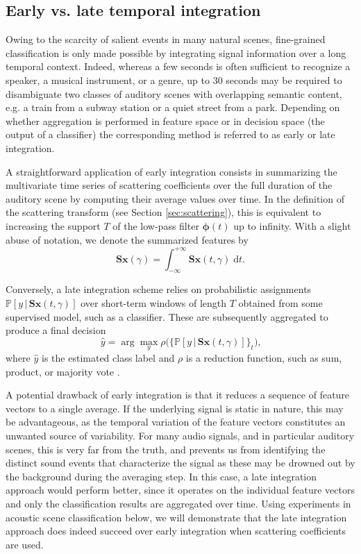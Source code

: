\documentclass[journal]{IEEEtran}
\makeatletter
\newcommand*{\eg}{e.g.\@\xspace}
\newcommand*{\vs}{vs.\@\xspace}
\makeatother
\begin{document}
\subsection{Early \vs late temporal integration}
\label{sec:eili}

Owing to the scarcity of salient events in many natural scenes,
fine-grained classification is only made
possible by integrating signal information over a long temporal context.
Indeed, whereas a few seconds is often sufficient to recognize a speaker,
a musical instrument, or a genre, up to $30$ seconds may be required
to disambiguate two classes of auditory scenes with overlapping semantic content, \eg a train from a subway station or a quiet street from a park.
Depending on whether aggregation is performed in feature space or in decision space (the output of a classifier) the corresponding method is referred to as early or late integration.

A straightforward application of early integration consists in summarizing the multivariate time series of scattering coefficients over the full duration of the auditory scene by computing their average values over time.
In the definition of the scattering transform (see Section \ref{sec:scattering}), this is equivalent to increasing the support $T$ of the low-pass filter $\boldsymbol{\phi}(t)$ up to infinity. With a slight abuse of notation, we denote the summarized features by
\begin{equation}
\mathbf{S}\boldsymbol{x}(\gamma) =
\int_{-\infty}^{+\infty} \mathbf{S}\boldsymbol{x}(t,\gamma)\;\mathrm{d}t\mbox{.}
\end{equation}

Conversely, a late integration scheme relies on probabilistic assignments $\mathbb{P}\left[y \,\vert\, \mathbf{S}\boldsymbol{x}(t,\gamma) \right]$ over short-term windows of length $T$ obtained from some supervised model, such as a classifier. These are subsequently aggregated to produce a final decision
\begin{equation}
\hat{y} = \arg \max_{y} \rho\Big(\big\{ \mathbb{P}\left[y \,\vert\, \mathbf{S}\boldsymbol{x}(t,\gamma) \right] \big\}_{t} \Big)\mbox{,}
\end{equation}
where $\hat{y}$ is the estimated class label and $\rho$ is a reduction function, such as sum, product, or majority vote \cite{Kittler1998}.

A potential drawback of early integration is that it reduces a sequence of feature vectors to a single average. If the underlying signal is static in nature, this may be advantageous, as the temporal variation of the feature vectors constitutes an unwanted source of variability. For many audio signals, and in particular auditory scenes, this is very far from the truth, and prevents us from identifying the distinct sound events that characterize the signal as these may be drowned out by the background during the averaging step. In this case, a late integration approach would perform better, since it operates on the individual feature vectors and only the classification results are aggregated over time. Using experiments in acoustic scene classification below, we will demonstrate that the late integration approach does indeed succeed over early integration when scattering coefficients are used.
\end{document}

